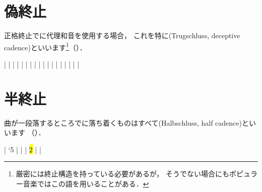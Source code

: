 \documentclass[dvipdfmx,uplatex,b5paper,openany,jbase=12Q,nomag*,textwidth-limit=44%
               ]{gachimuchi}
\begin{document}
\section{偽終止}
正格終止でに代理和音を使用する場合，
これを特に\xkanjispace(Trugschluss, deceptive cadence)といいます\footnote{%
  厳密には終止構造を持っている必要があるが，
  そうでない場合にもポピュラー音楽ではこの語を用いることがある．
}（）．

\begin{Music}[.6\linewidth]
  \generalmeter{\meterC}%
  \Startpiece%
  \NOTEs%
  |%
  \en\bar%
  \NOTEs%
  |%
  \en\doublebar%
  \NOTEs%
  |%
  \en\bar%
  \NOTEs%
  |%
  \en\doublebar%
  \NOTEs%
  |%
  \en\bar%
  \NOTEs%
  |%
  \en\setdoublebar%
  \endpiece
  \generalmeter{\meterC}%
  \Startpiece%
  \NOTEs%
  |%
  \en\bar%
  \NOTEs%
  |%
  \en\doublebar%
  \NOTEs%
  |%
  \en\bar%
  \NOTEs%
  |%
  \en\doublebar%
  \NOTEs%
  |%
  \en\bar%
  \NOTEs%
  |%
  \en\setdoublebar%
  \endpiece%
\end{Music}

\section{半終止}
曲が一段落するところで\Gnv に落ち着くものはすべて\xkanjispace(Halbschluss, half cadence)といいます
（）．

\begin{Music}[.6\linewidth]
  \generalmeter{\meterC}%
  \Startpiece%
  \NOtes%
  \sk{}|%
  \lq{5}%
  \en\bar%
  \NOtes%
  |%
  \en\NOTes%
  |%
  \hl{2}%
  \en\bar
  \NOtes%
  \Mryaku|%
  \Mryaku%
  \en\setemptybar%
  \endpiece
\end{Music}
\end{document}

